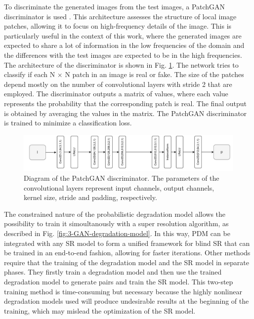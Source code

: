     To discriminate the generated images from the test images, a PatchGAN discriminator is used \cite{isola2018imagetoimage}. This architecture assesses the structure of local image patches, allowing it to focus on high-frequency details of the image. This is particularly useful in the context of this work, where the generated images are expected to share a lot of information in the low frequencies of the domain and the differences with the test images are expected to be in the high frequencies. The architecture of the discriminator is shown in Fig. \ref{fig:3-slim-patchgan-module}.
    The network tries to classify if each N × N patch in an image is real or fake. The size of the patches depend mostly on the number of convolutional layers with stride 2 that are employed.  The discriminator outputs a matrix of values, where each value represents the probability that the corresponding patch is real. The final output is obtained by averaging the values in the matrix. The PatchGAN discriminator is trained to minimize a classification loss. 

    \begin{figure}[H]
        \centering
        \includegraphics[width=\textwidth]{Includes/3-slim_patchGAN_architecture.pdf}
        \caption{Diagram of the PatchGAN discriminator.
                 The parameters of the convolutional layers represent input channels, output channels, kernel size, stride and padding, respectively. }
        \label{fig:3-slim-patchgan-module}
    \end{figure}

    
    The constrained nature of the probabilistic degradation model allows the possibility to train it simoultanously with a super resolution algorithm, as described in Fig. \ref{fig:3-GAN-degradation-model}.      
    In this way, PDM can be integrated with any SR model to form a unified framework for blind SR that can be trained in an end-to-end fashion, allowing for faster iterations.
    Other methods \cite{fritsche2019frequency} \cite{wei2020unsupervised} require that the training of the degradation model and the SR model in separate phases. They firstly train a degradation model and then use the trained degradation model to generate pairs and train the SR model.
    This two-step training method is time-consuming but necessary because the highly nonlinear degradation models used will produce undesirable results at the beginning of the training, which may mislead the optimization of the SR model.

